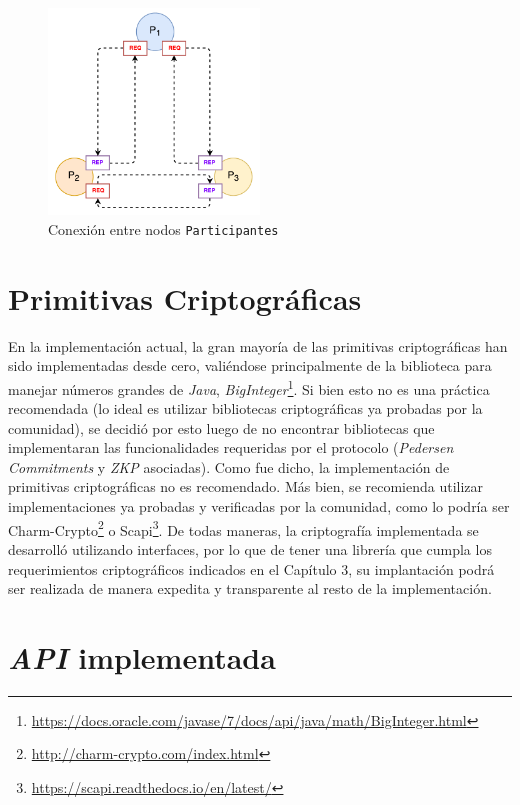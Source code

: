 {\begin{figure}[H]
  \centering
    \includegraphics[width=0.5\textwidth]{imagenes/participants_connection.pdf}
  \caption{Conexión entre nodos \texttt{Participantes}}
  \label{fig:connections-participants}
\end{figure}

\section{Primitivas Criptográficas}

En la implementación actual, la gran mayoría de las primitivas criptográficas 
han sido implementadas desde cero, valiéndose principalmente de la biblioteca 
para manejar números grandes de \emph{Java}, \emph{BigInteger}\footnote{\url{
https://docs.oracle.com/javase/7/docs/api/java/math/BigInteger.html}}. Si bien 
esto no es una práctica recomendada (lo ideal es utilizar bibliotecas 
criptográficas ya probadas por la comunidad), se decidió por esto luego de no 
encontrar bibliotecas que implementaran las funcionalidades requeridas por el 
protocolo (\emph{Pedersen Commitments} y \emph{ZKP} asociadas). Como fue 
dicho, la implementación de primitivas criptográficas no es recomendado. Más 
bien, se recomienda utilizar implementaciones ya probadas y verificadas por la 
comunidad, como lo podría ser 
Charm-Crypto\footnote{\url{http://charm-crypto.com/index.html}} o 
Scapi\footnote{\url{https://scapi.readthedocs.io/en/latest/}}. De todas 
maneras, la criptografía implementada se desarrolló utilizando interfaces, por 
lo que de tener una librería que cumpla los requerimientos criptográficos 
indicados en el Capítulo 3, su implantación podrá ser realizada de manera 
expedita y transparente al resto de la implementación.

\section{\emph{API} implementada}

}
